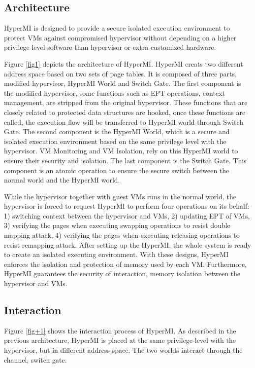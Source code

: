 \documentclass[conference]{IEEEtran}
\begin{document}
\subsection{Architecture} 
HyperMI is designed to provide a secure isolated execution environment to protect VMs against compromised hypervisor without depending on a higher privilege level software than hypervisor or extra customized hardware.



Figure \ref{fig1} depicts the architecture of HyperMI. HyperMI creats two different address space based on two sets of page tables. It is composed of three parts, modified hypervisor, HyperMI World and Switch Gate. The first component is the modified hypervisor, some functions such as EPT operations, context management, are stripped from the original hypervisor. These functions that are closely related to protected data structures are hooked, once these functions are called, the execution flow will be transferred to HyperMI world through Switch Gate. The second component is the HyperMI World, which is a secure and isolated execution environment based on the same privilege level with the hypervisor. VM Monitoring and VM Isolation, rely on this HyperMI world to ensure their security and isolation. The last component is the Switch Gate. This component is an atomic operation to ensure the secure switch between the normal world and the HyperMI world. 


While the hypervisor together with guest VMs runs in the normal world, the hypervisor is forced to request HyperMI to perform four operations on its behalf: 1) switching context between the hypervisor and VMs, 2) updating EPT of VMs, 3) verifying the pages when executing swapping operations to resist double mapping attack, 4) verifying the pages when executing releasing operations to resist remapping attack. After setting up the HyperMI, the whole system is ready to create an isolated executing environment. With these designs, HyperMI enforces the isolation and protection of memory used by each VM. Furthermore, HyperMI guarantees the security of interaction, memory isolation between the hypervisor and VMs.



\iffalse
\subsection{Interaction} \label{IN}


Figure \ref{fig+1} shows the interaction process of HyperMI. 
As described in the previous architecture, HyperMI is placed at the same privilege-level with the hypervisor, but in different address space. The two worlds interact through the channel, switch gate.
\end{document}
